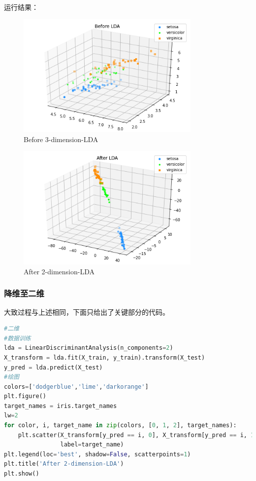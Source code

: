\documentclass[11pt,a4paper]{article}\usepackage[]{graphicx}\usepackage[]{color}
\begin{document}
  运行结果：
  \begin{figure}[H]
		\centering
		\includegraphics[width=0.8\textwidth]{Figure/LDA1.png}
		\caption{Before 3-dimension-LDA}
		\label{fig:my_label}
	\end{figure}
	\begin{figure}[H]
		\centering
		\includegraphics[width=0.8\textwidth]{Figure/LDA3.png}
		\caption{After 2-dimension-LDA}
		\label{fig:my_label}
	\end{figure}
	
	\subsubsection{降维至二维}
	大致过程与上述相同，下面只给出了关键部分的代码。
		\begin{lstlisting}[language=python, caption=2—dimension-LDA  ,label={labelkode}]
  #二维
#数据训练
lda = LinearDiscriminantAnalysis(n_components=2)
X_transform = lda.fit(X_train, y_train).transform(X_test)
y_pred = lda.predict(X_test)
#绘图
colors=['dodgerblue','lime','darkorange']
plt.figure()
target_names = iris.target_names
lw=2
for color, i, target_name in zip(colors, [0, 1, 2], target_names):
    plt.scatter(X_transform[y_pred == i, 0], X_transform[y_pred == i, 1], alpha=.8, color=color,
                label=target_name)
plt.legend(loc='best', shadow=False, scatterpoints=1)
plt.title('After 2-dimension-LDA')
plt.show()
  \end{lstlisting}
\end{document}
